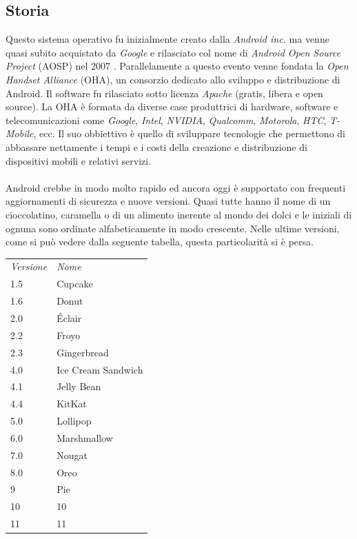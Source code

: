 \subsection{Storia}
Questo sistema operativo fu inizialmente creato dalla \textit{Android inc.} ma venne quasi subito acquistato da \textit{Google} e rilasciato col nome di \textit{Android Open Source Project} (AOSP) nel 2007 \cite{androiden}. Parallelamente a questo evento venne fondata la \textit{Open Handset Alliance} (OHA), un consorzio dedicato allo sviluppo e distribuzione di Android. Il software fu rilasciato sotto licenza \textit{Apache} (gratis, libera e open source). La OHA è formata da diverse case produttrici di hardware, software e telecomunicazioni come \textit{Google}, \textit{Intel}, \textit{NVIDIA}, \textit{Qualcomm}, \textit{Motorola}, \textit{HTC}, \textit{T-Mobile}, ecc. \cite{androiden} Il suo obbiettivo è quello di sviluppare tecnologie che permettono di abbassare nettamente i tempi e i costi della creazione e distribuzione di dispositivi mobili e relativi servizi.\\
\\
Android crebbe in modo molto rapido ed ancora oggi è supportato con frequenti aggiornamenti di sicurezza e nuove versioni. Quasi tutte hanno il nome di un cioccolatino, caramella o di un alimento inerente al mondo dei dolci e le iniziali di ognuna sono ordinate alfabeticamente in modo crescente. Nelle ultime versioni, come si può vedere dalla seguente tabella, questa particolarità si è persa.


\begin{center}
    
    \begin{tabular}{ll}
    \textit{Versione} & \textit{Nome} \\ [0.5ex]
    \cline{1-2}
       1.5 & Cupcake\\ [0.5ex]
       1.6 & Donut\\ [0.5ex]
       2.0 & Éclair\\ [0.5ex]
       2.2 & Froyo\\ [0.5ex]
       2.3 & Gingerbread\\ [0.5ex]
       4.0 & Ice Cream Sandwich\\ [0.5ex]
       4.1 & Jelly Bean\\ [0.5ex]
       4.4 & KitKat\\ [0.5ex]
       5.0 & Lollipop\\ [0.5ex]
       6.0 & Marshmallow\\ [0.5ex]
       7.0 & Nougat\\ [0.5ex]
       8.0 & Oreo\\ [0.5ex]
       9 & Pie\\ [0.5ex]
       10 & 10\\ [0.5ex]
       11 & 11\\ [0.5ex]
    \end{tabular}
\end{center}

